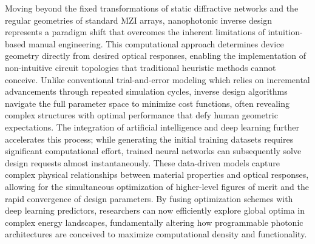 \documentclass[11pt]{article}
\begin{document}
Moving beyond the fixed transformations of static diffractive networks and the regular geometries of standard MZI arrays, nanophotonic inverse design represents a paradigm shift that overcomes the inherent limitations of intuition-based manual engineering. \citep{doi_10_1088_1361_6633_ae7f9a_e05f9b1d} \citep{doi_10_1109_icufn61752_2024_10625552_985a60f2} This computational approach determines device geometry directly from desired optical responses, enabling the implementation of non-intuitive circuit topologies that traditional heuristic methods cannot conceive. Unlike conventional trial-and-error modeling which relies on incremental advancements through repeated simulation cycles, inverse design algorithms navigate the full parameter space to minimize cost functions, often revealing complex structures with optimal performance that defy human geometric expectations. The integration of artificial intelligence and deep learning further accelerates this process; while generating the initial training datasets requires significant computational effort, trained neural networks can subsequently solve design requests almost instantaneously. These data-driven models capture complex physical relationships between material properties and optical responses, allowing for the simultaneous optimization of higher-level figures of merit and the rapid convergence of design parameters. By fusing optimization schemes with deep learning predictors, researchers can now efficiently explore global optima in complex energy landscapes, fundamentally altering how programmable photonic architectures are conceived to maximize computational density and functionality. \citep{doi_10_1515_nanoph_2021_0660_2d91a441} \citep{doi_10_1515_nanoph_2018_0183_d85e9193}
\end{document}
